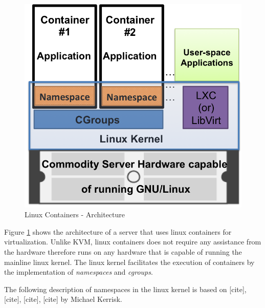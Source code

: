 \begin{figure}[htbp]
\centering
\includegraphics[width=130mm]{lxc-arch.png}
\caption{Linux Containers - Architecture}
\label{img_lxc_arch}
\end{figure}

Figure \ref{img_lxc_arch} shows the architecture of a server that uses linux containers for virtualization. Unlike KVM, linux containers does not require any assistance from the hardware therefore runs on any hardware that is capable of running the mainline linux kernel. The linux kernel facilitates the execution of containers by the implementation of \emph{namespaces} and \emph{cgroups}. 


The following description of namespaces in the linux kernel is based on [cite], [cite], [cite], [cite] by Michael Kerrisk.



